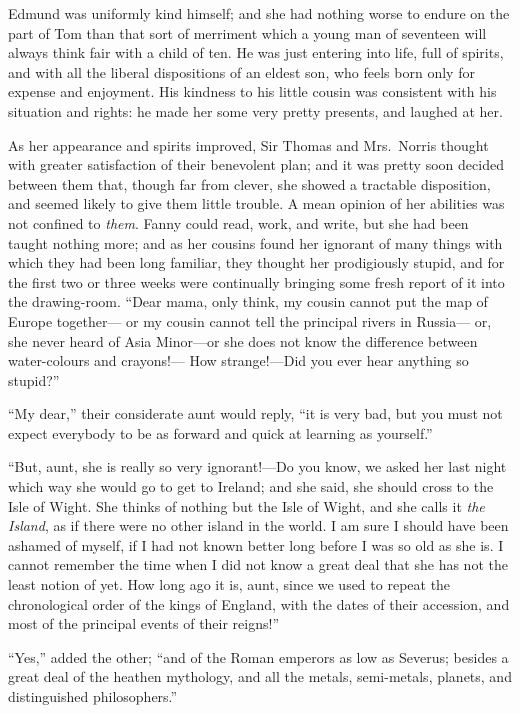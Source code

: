 Edmund was uniformly kind himself; and she had nothing
worse to endure on the part of Tom than that sort
of merriment which a young man of seventeen will always
think fair with a child of ten.  He was just entering
into life, full of spirits, and with all the liberal
dispositions of an eldest son, who feels born only
for expense and enjoyment.  His kindness to his little
cousin was consistent with his situation and rights:
he made her some very pretty presents, and laughed at her.

As her appearance and spirits improved, Sir Thomas and Mrs.\ Norris
thought with greater satisfaction of their benevolent plan;
and it was pretty soon decided between them that,
though far from clever, she showed a tractable disposition,
and seemed likely to give them little trouble.  A mean
opinion of her abilities was not confined to \emph{them}.
Fanny could read, work, and write, but she had been taught
nothing more; and as her cousins found her ignorant
of many things with which they had been long familiar,
they thought her prodigiously stupid, and for the first
two or three weeks were continually bringing some fresh
report of it into the drawing-room. ``Dear mama, only think,
my cousin cannot put the map of Europe together---%
or my cousin cannot tell the principal rivers in Russia---%
or, she never heard of Asia Minor---or she does not know
the difference between water-colours and crayons!---%
How strange!---Did you ever hear anything so stupid?''

``My dear,'' their considerate aunt would reply,
``it is very bad, but you must not expect everybody
to be as forward and quick at learning as yourself.''

``But, aunt, she is really so very ignorant!---Do you know,
we asked her last night which way she would go to get
to Ireland; and she said, she should cross to the Isle
of Wight.  She thinks of nothing but the Isle of Wight,
and she calls it \emph{the Island}, as if there were no
other island in the world.  I am sure I should have been
ashamed of myself, if I had not known better long before I
was so old as she is.  I cannot remember the time when I
did not know a great deal that she has not the least
notion of yet.  How long ago it is, aunt, since we used
to repeat the chronological order of the kings of England,
with the dates of their accession, and most of the principal
events of their reigns!''

``Yes,'' added the other; ``and of the Roman emperors
as low as Severus; besides a great deal of the heathen
mythology, and all the metals, semi-metals, planets,
and distinguished philosophers.''

